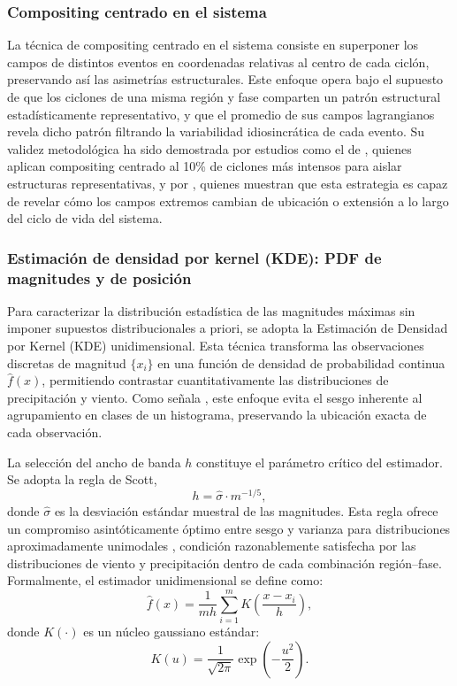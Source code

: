 \subsubsection{Compositing centrado en el sistema}\label{subsubsec:tb_compositing}

La técnica de compositing centrado en el sistema consiste en superponer los campos de distintos eventos en coordenadas relativas al centro de cada ciclón, preservando así las asimetrías estructurales. Este enfoque opera bajo el supuesto de que los ciclones de una misma región y fase comparten un patrón estructural estadísticamente representativo, y que el promedio de sus campos lagrangianos revela dicho patrón filtrando la variabilidad idiosincrática de cada evento. Su validez metodológica ha sido demostrada por estudios como el de \citet{priestley2022improved}, quienes aplican compositing centrado al 10\% de ciclones más intensos para aislar estructuras representativas, y por \citet{han2025system}, quienes muestran que esta estrategia es capaz de revelar cómo los campos extremos cambian de ubicación o extensión a lo largo del ciclo de vida del sistema.

\subsubsection{Estimación de densidad por kernel (KDE): PDF de magnitudes y de posición}\label{subsubsec:tb_kde}

Para caracterizar la distribución estadística de las magnitudes máximas sin imponer supuestos distribucionales a priori, se adopta la Estimación de Densidad por Kernel (KDE) unidimensional. Esta técnica transforma las observaciones discretas de magnitud $\{x_i\}$ en una función de densidad de probabilidad continua $\hat{f}(x)$, permitiendo contrastar cuantitativamente las distribuciones de precipitación y viento. 
Como señala \citet{weglarczyk2018kernel}, este enfoque evita el sesgo inherente al agrupamiento en clases de un histograma, preservando la ubicación exacta de cada observación. 

La selección del ancho de banda $h$ constituye el parámetro crítico del estimador. Se adopta la regla 
de Scott,
\begin{equation}\label{eq:scott_rule}
h = \hat{\sigma} \cdot m^{-1/5},
\end{equation}
donde $\hat{\sigma}$ es la desviación estándar muestral de las magnitudes. Esta regla ofrece un compromiso asintóticamente óptimo entre sesgo y varianza para distribuciones aproximadamente unimodales \citep{weglarczyk2018kernel}, condición razonablemente satisfecha por las distribuciones de viento y precipitación dentro de cada combinación región--fase. Formalmente, el estimador unidimensional se define como:
\begin{equation}\label{eq:tb_kde_pdf}
\hat{f}(x) = \frac{1}{m h} \sum_{i=1}^{m} K\!\left(\frac{x - x_i}{h}\right),
\end{equation}
donde $K(\cdot)$ es un núcleo gaussiano estándar:
\begin{equation}\label{eq:tb_gaussian_kernel}
K(u) = \frac{1}{\sqrt{2\pi}} \exp\!\left(-\frac{u^2}{2}\right).
\end{equation}

